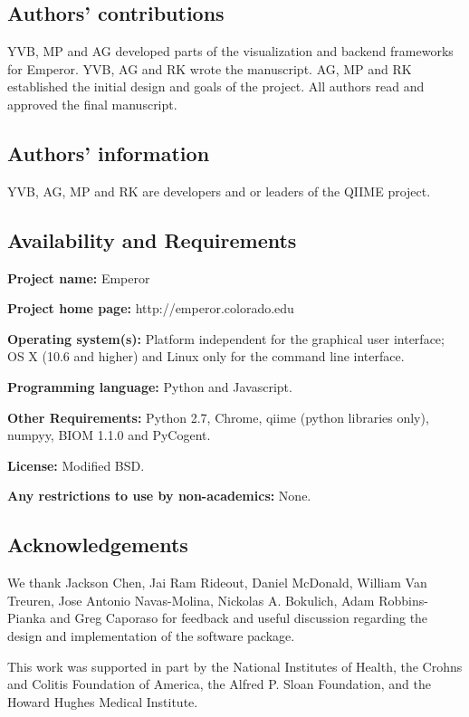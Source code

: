 \subsection{Authors' contributions}
YVB, MP and AG developed parts of the visualization and backend frameworks for Emperor. YVB, AG and RK wrote the manuscript. AG, MP and RK established the initial design and goals of the project. All authors read and approved the final manuscript.

\subsection{Authors' information}
YVB, AG, MP and RK are developers and or leaders of the QIIME project.

\subsection{Availability and Requirements}

\textbf{Project name:} Emperor

\textbf{Project home page:} http://emperor.colorado.edu

\textbf{Operating system(s):} Platform independent for the graphical user interface; OS X (10.6 and higher) and Linux only for the command line interface.

\textbf{Programming language:} Python and Javascript.

\textbf{Other Requirements:} Python 2.7, Chrome, \gls{qiime} (python libraries only), \gls{numpy}y, BIOM 1.1.0 and PyCogent.

\textbf{License:} Modified BSD.

\textbf{Any restrictions to use by non-academics:} None.

\subsection{Acknowledgements}

We thank Jackson Chen, Jai Ram Rideout, Daniel McDonald, William Van Treuren, Jose Antonio Navas-Molina, Nickolas A. Bokulich, Adam Robbins-Pianka and Greg Caporaso for feedback and useful discussion regarding the design and implementation of the software package.
 
This work was supported in part by the National Institutes of Health, the Crohns and Colitis Foundation of America, the Alfred P. Sloan Foundation, and the Howard Hughes Medical Institute.
